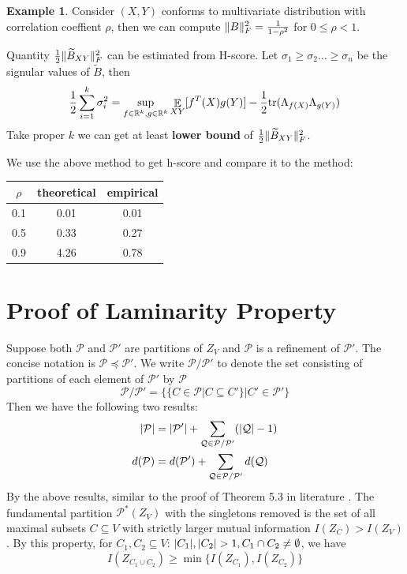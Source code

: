 \documentclass{article}
\DeclareMathOperator\E{\mathbb{E}}
\def\R{\mathbb{R}}
\DeclarePairedDelimiter\abs{\lvert}{\rvert}
\DeclarePairedDelimiter\norm{\lVert}{\rVert}
\theoremstyle{definition}
\newtheorem{example}{Example}
\begin{document}
\begin{example}\label{ex:rho}
Consider $(X,Y)$ conforms to multivariate distribution with correlation coeffient $\rho$, then
we can compute $\norm{B}_F^2 = \frac{1}{1-\rho^2}$ for $0\leq \rho < 1 $.
\end{example}


Quantity ${1 \over 2} \norm{\widetilde{B}_{XY}}_F^2$ can be estimated from H-score.
Let $\sigma_1 \geq \sigma_2 \dots \geq \sigma_n$ be the signular values of  $\widetilde{B}$,
then
\begin{equation}
{1 \over 2} \sum_{i=1}^k \sigma_i^2  = \displaystyle\sup_{f\in \R^k, g \in \R^k} \E_{XY}[f^T(X)g(Y)]- {1 \over 2} \mathrm{tr}(\Lambda_{f(X)} \Lambda_{g(Y)})
\end{equation}
Take proper $k$ we can get at least \textbf{lower bound} of ${1 \over 2} \norm{\widetilde{B}_{XY}}_F^2$.

We use the above method to get h-score and compare it to the method:

\begin{table}[!ht]
\centering
\begin{tabular}{ccc}
\hline
$\rho$ & theoretical & empirical \\
\hline
0.1 & 0.01 & 0.01 \\
0.5 & 0.33 & 0.27 \\
0.9 & 4.26 & 0.78 \\
\hline
\end{tabular}
\end{table}

\section{Proof of Laminarity Property}\label{sec:lp}
Suppose both $\mathcal{P}$ and $\mathcal{P}'$ are partitions of $Z_V$ and $\mathcal{P}$ is a refinement of $\mathcal{P}'$.
The concise notation is $\mathcal{P} \preceq \mathcal{P}'$.
We write $\mathcal{P}/\mathcal{P}'$ to denote the set consisting of partitions of each element of $\mathcal{P}' $ by $\mathcal{P}$
\begin{equation}
\mathcal{P}/\mathcal{P}' = \{ \{ C\in \mathcal{P} | C \subseteq C'\} | C'\in \mathcal{P}'\}
\end{equation}
Then we have the following two results:
\begin{align}
\abs{\mathcal{P}} & = \abs{\mathcal{P}'} + \sum_{\mathcal{Q} \in \mathcal{P}/\mathcal{P}'}(\abs{\mathcal{Q}}-1) \\
d(\mathcal{P}) & = d(\mathcal{P}') + \sum_{\mathcal{Q} \in \mathcal{P}/\mathcal{P}'}d(\mathcal{Q})
\end{align}
By the above results, similar to the proof of Theorem 5.3 in literature \cite{ska}.
The fundamental partition $\mathcal{P}^*(Z_V)$ with the singletons removed
is the set of all maximal subsets $C\subseteq V$ with strictly larger mutual
information $I(Z_C) > I(Z_V)$. 
By this property, 
for $C_1, C_2 \subseteq V$: $\abs{C_1},\abs{C_2}>1, C_1 \cap C_2 \neq \emptyset$, we have
\begin{equation}
I(Z_{C_1 \cup C_2}) \geq \min\{ I(Z_{C_1}), I(Z_{C_2})\}
\end{equation}
\end{document}
